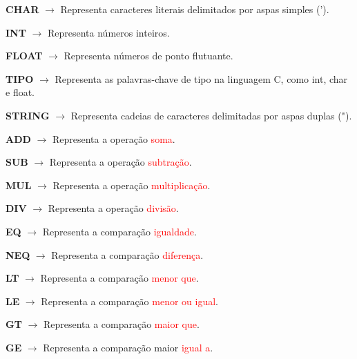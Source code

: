 \documentclass[12pt,a4paper]{report}
\begin{document}
    \hspace{3cm}
    \textbf{CHAR} $\rightarrow$ Representa caracteres literais delimitados por aspas simples (').
    
    \hspace{3cm}
    \textbf{INT} $\rightarrow$ Representa números inteiros.

    \hspace{3cm}
    \textbf{FLOAT} $\rightarrow$ Representa números de ponto flutuante.
    
    \hspace{3cm}
    \textbf{TIPO} $\rightarrow$ Representa as palavras-chave de tipo na linguagem C, como int, char e float.

    \hspace{3cm}
    \textbf{STRING} $\rightarrow$ Representa cadeias de caracteres delimitadas por aspas duplas (").

    \hspace{3cm}
    \textbf{ADD} $\rightarrow$ Representa a operação \textcolor{red}{soma}.

    \hspace{3cm}
    \textbf{SUB} $\rightarrow$ Representa a operação \textcolor{red}{subtração}.

    \hspace{3cm}
    \textbf{MUL} $\rightarrow$ Representa a operação \textcolor{red}{multiplicação}.

    \hspace{3cm}
    \textbf{DIV} $\rightarrow$ Representa a operação \textcolor{red}{divisão}.

    \hspace{3cm}
    \textbf{EQ} $\rightarrow$ Representa a comparação \textcolor{red}{igualdade}.

    \hspace{3cm}
    \textbf{NEQ} $\rightarrow$ Representa a comparação \textcolor{red}{diferença}.

    \hspace{3cm}
    \textbf{LT} $\rightarrow$ Representa a comparação \textcolor{red}{menor que}.

    \hspace{3cm}
    \textbf{LE} $\rightarrow$ Representa a comparação \textcolor{red}{menor ou igual}.

    \hspace{3cm}
    \textbf{GT} $\rightarrow$ Representa a comparação \textcolor{red}{maior que}.

    \hspace{3cm}
    \textbf{GE} $\rightarrow$ Representa a comparação maior \textcolor{red}{igual a}.
\end{document}
